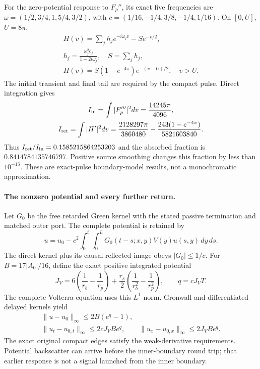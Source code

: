 \documentclass[10pt,twocolumn,letterpaper]{article}
\begin{document}
For the zero-potential response to $F_p''$, its exact five frequencies
are $\omega=(1/2,3/4,1,5/4,3/2)$, with
$c=(1/16,-1/4,3/8,-1/4,1/16)$. On $[0,U]$, $U=8\pi$,
\begin{equation}
\begin{gathered}
 H(v)=\sum_jh_je^{-i\omega_jv}-S e^{-v/2},\\
 h_j=\frac{\omega_j^2c_j}{1-2i\omega_j},\quad S=\sum_jh_j,\\
 H(v)=S(1-e^{-4\pi})e^{-(v-U)/2},\quad v>U.
\end{gathered}
\label{eq:wp-pulse-return}
\end{equation}
The initial transient and final tail are required by the compact pulse.
Direct integration gives
\begin{equation}
\begin{gathered}
 I_{\rm in}=\int|F_p'''|^2dv=\frac{14245\pi}{4096},\\
 I_{\rm ret}=\int|H'|^2dv
 =\frac{2128297\pi}{3860480}
   -\frac{243(1-e^{-4\pi})}{5821603840}.
\end{gathered}
\label{eq:wp-energy-coefficients}
\end{equation}
Thus $I_{\rm ret}/I_{\rm in}=0.1585215864253203$ and the absorbed
fraction is $0.8414784135746797$. Positive source smoothing changes this
fraction by less than $10^{-13}$. These are exact-pulse boundary-model
results, not a monochromatic approximation.

\paragraph{The nonzero potential and every further return.}
Let $G_0$ be the free retarded Green kernel with the stated passive
termination and matched outer port. The complete potential is retained by
\begin{equation}
 u=u_0-c^2\int_0^t\!\int_0^L
       G_0(t-s;x,y)V(y)u(s,y)\,dy\,ds.
 \label{eq:wp-Volterra}
\end{equation}
The direct kernel plus its causal reflected image obeys $|G_0|\leq1/c$.
For $B=17|A_0|/16$, define the exact positive integrated potential
\[
 J_V=6\left(\frac1{r_b}-\frac1{r_p}\right)
 +\frac{r_s}{2}\left(\frac1{r_b^2}-\frac1{r_p^2}\right),
 \qquad q=cJ_VT.
\]
The complete Volterra equation uses this $L^1$ norm. Gronwall and differentiated
delayed kernels yield
\begin{equation}
\begin{gathered}
 \|u-u_0\|_\infty\leq2B(e^q-1),\\
 \|u_t-u_{0,t}\|_\infty\leq2cJ_VB e^q,\qquad
 \|u_x-u_{0,x}\|_\infty\leq2J_VB e^q.
\end{gathered}
\label{eq:wp-errors}
\end{equation}
The exact original compact edges satisfy the weak-derivative requirements.
Potential backscatter can arrive before the inner-boundary round trip;
that earlier response is not a signal launched from the inner boundary.
\end{document}
